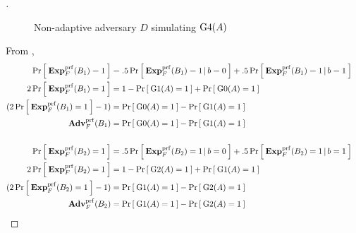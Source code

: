 \begin{proof}[]
\begin{figure}
\centering
{}
\caption{Non-adaptive adversary $D$ simulating $\game{4}(A)$} \label{fig:D}
\end{figure}	

%
\noindent
From ,
\begin{align}
\nonumber \Prob{\ExpPRF{F}{B_1} = 1} &= .5\Prob{\ExpPRF{F}{B_1}=1\,|\,b=0} + .5\Prob{\ExpPRF{F}{B_1} = 1\,|\,b=1}\\
\nonumber 2\Prob{\ExpPRF{F}{B_1} = 1} &= 1-\Prob{\game{1}(A)=1} + \Prob{\game{0}(A)=1}\\
\nonumber (2\Prob{\ExpPRF{F}{B_1} = 1} - 1)  &= \Prob{\game{0}(A)=1} - \Prob{\game{1}(A)=1}\\
 \AdvPRF{F}{B_1} &= \Prob{\game{0}(A)=1} - \Prob{\game{1}(A)=1} \label{eq:11}\\
\nonumber& &\\
\nonumber \Prob{\ExpPRF{F}{B_2} = 1} &= .5\Prob{\ExpPRF{F}{B_2}=1\,|\,b=0} + .5\Prob{\ExpPRF{F}{B_2} = 1\,|\,b=1}\\
\nonumber 2\Prob{\ExpPRF{F}{B_2} = 1} &= 1-\Prob{\game{2}(A)=1} + \Prob{\game{1}(A)=1}\\
\nonumber (2\Prob{\ExpPRF{F}{B_2} = 1} - 1)  &= \Prob{\game{1}(A)=1} - \Prob{\game{2}(A)=1}\\
 \AdvPRF{F}{B_2} &= \Prob{\game{1}(A)=1} - \Prob{\game{2}(A)=1} \label{eq:12}
\end{align}


\end{proof}
